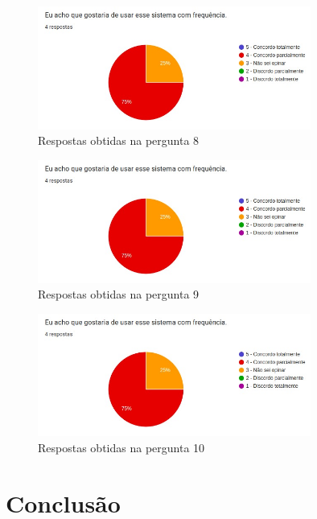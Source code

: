 \documentclass[12pt]{tcc}
\begin{document}
	\begin{figure}[!ht]
		\centering
		\includegraphics[width=0.8\textwidth]{figures/respostas-pergunta-8.jpeg}
		\caption{Respostas obtidas na pergunta 8}
		\label{fig:respostas-pergunta-8}
	\end{figure}

	\begin{figure}[!ht]
		\centering
		\includegraphics[width=0.8\textwidth]{figures/respostas-pergunta-9.jpeg}
		\caption{Respostas obtidas na pergunta 9}
		\label{fig:respostas-pergunta-9}
	\end{figure}

	\begin{figure}[!ht]
		\centering
		\includegraphics[width=0.8\textwidth]{figures/respostas-pergunta-10.jpeg}
		\caption{Respostas obtidas na pergunta 10}
		\label{fig:respostas-pergunta-10}
	\end{figure}

\chapter{Conclusão}
	\label{cap:conclusão}
\end{document}
